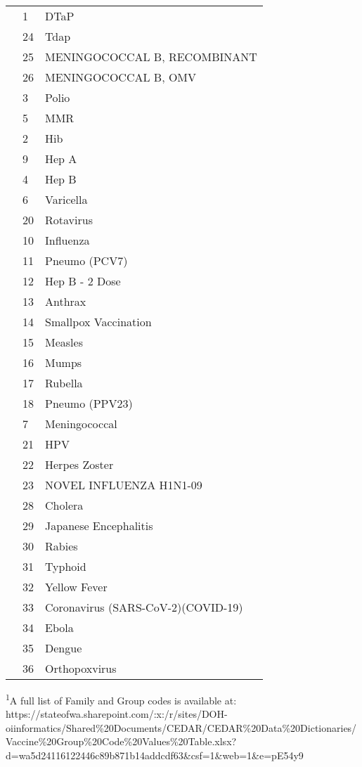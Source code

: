 \documentclass[
  letterpaper,
  DIV=11,
  numbers=noendperiod]{scrreprt}
\begin{document}
\begin{longtable}{l|ll}
\midrule
  & 1 & DTaP \\ 
  & 24 & Tdap \\ 
  & 25 & MENINGOCOCCAL B, RECOMBINANT \\ 
  & 26 & MENINGOCOCCAL B, OMV \\ 
  & 3 & Polio \\ 
  & 5 & MMR \\ 
  & 2 & Hib \\ 
  & 9 & Hep A \\ 
  & 4 & Hep B \\ 
  & 6 & Varicella \\ 
  & 20 & Rotavirus \\ 
  & 10 & Influenza \\ 
  & 11 & Pneumo (PCV7) \\ 
  & 12 & Hep B - 2 Dose \\ 
  & 13 & Anthrax \\ 
  & 14 & Smallpox Vaccination \\ 
  & 15 & Measles \\ 
  & 16 & Mumps \\ 
  & 17 & Rubella \\ 
  & 18 & Pneumo (PPV23) \\ 
  & 7 & Meningococcal \\ 
  & 21 & HPV \\ 
  & 22 & Herpes Zoster \\ 
  & 23 & NOVEL INFLUENZA H1N1-09 \\ 
  & 28 & Cholera \\ 
  & 29 & Japanese Encephalitis \\ 
  & 30 & Rabies \\ 
  & 31 & Typhoid \\ 
  & 32 & Yellow Fever \\ 
  & 33 & Coronavirus (SARS-CoV-2)(COVID-19) \\ 
  & 34 & Ebola \\ 
  & 35 & Dengue \\ 
  & 36 & Orthopoxvirus \\ 
\bottomrule
\end{longtable}
\begin{minipage}{\linewidth}
\textsuperscript{1}A full list of Family and Group codes is available at: https://stateofwa.sharepoint.com/:x:/r/sites/DOH-oiinformatics/Shared\%20Documents/CEDAR/CEDAR\%20Data\%20Dictionaries/Vaccine\%20Group\%20Code\%20Values\%20Table.xlsx?d=wa5d24116122446c89b871b14addcdf63\&csf=1\&web=1\&e=pE54y9\\
\end{minipage}
\end{document}
